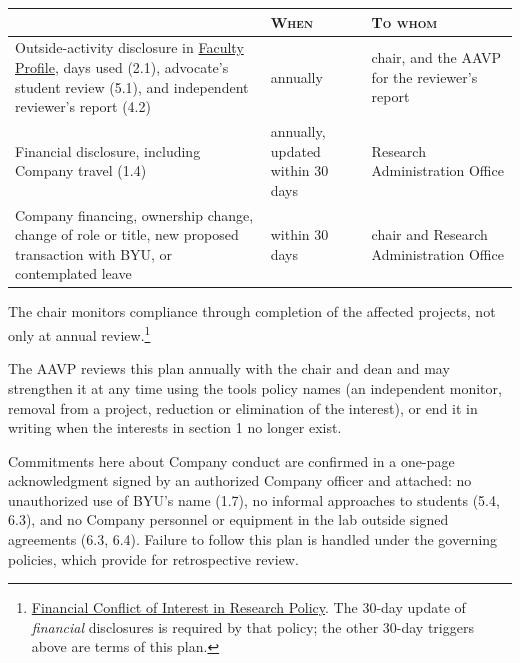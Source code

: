 \documentclass[11pt]{article}
\begin{document}
{\footnotesize
\setlength{\extrarowheight}{2pt}
\begin{tabularx}{\textwidth}{@{} >{\RaggedRight\arraybackslash}X >{\RaggedRight\arraybackslash}p{1.2in} >{\RaggedRight\arraybackslash}p{1.5in} @{}}
\toprule
{\color{byunavy}\scshape What} &
{\color{byunavy}\scshape When} &
{\color{byunavy}\scshape To whom} \\
\midrule
Outside-activity disclosure in
\href{https://facultyprofile.byu.edu/}{Faculty Profile}, days used (2.1),
advocate's student review (5.1), and independent reviewer's report (4.2) &
annually & chair, and the AAVP for the reviewer's report \\
Financial disclosure, including Company travel (1.4) & annually, updated
within 30 days & Research Administration Office \\
Company financing, ownership change, change of role or title, new proposed
transaction with BYU, or contemplated leave & within 30 days & chair and
Research Administration Office \\
\bottomrule
\end{tabularx}}

\vspace{2pt}
 The chair monitors compliance through completion of the affected
projects, not only at annual
review.\footnote{\href{https://policy.byu.edu/view/financial-conflict-of-interest-in-research-policy}{Financial
Conflict of Interest in Research Policy}. The 30-day update of
\emph{financial} disclosures is required by that policy; the other 30-day
triggers above are terms of this plan.}

 The AAVP reviews this plan annually with the chair and dean and
may strengthen it at any time using the tools policy names (an independent
monitor, removal from a project, reduction or elimination of the interest), or
end it in writing when the interests in section 1 no longer exist.

 Commitments here about Company conduct are confirmed in a
one-page acknowledgment signed by an authorized Company officer and attached:
no unauthorized use of BYU's name (1.7), no informal approaches to students (5.4, 6.3), and
no Company personnel or equipment in the lab outside signed agreements (6.3,
6.4). Failure to follow this plan is handled under the governing policies,
which provide for retrospective review.

\end{document}
